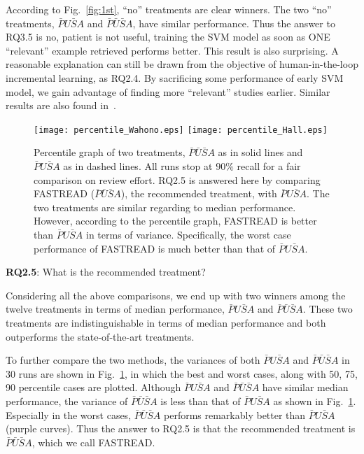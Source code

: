 \documentclass{svjour3}
\theoremstyle{break}
\begin{document}
According to Fig.~\ref{fig:1st}, ``no'' treatments are clear winners. The two ``no'' treatments, $\bar{P}U\bar{S}A$ and $\bar{P}\bar{U}\bar{S}A$, have similar performance. Thus the answer to RQ3.5 is no, patient is not useful, training the SVM model as soon as ONE ``relevant'' example retrieved performs better. This result is also surprising. A reasonable explanation can still be drawn from the objective of human-in-the-loop incremental learning, as RQ2.4. By sacrificing some performance of early SVM model, we gain advantage of finding more ``relevant'' studies earlier. Similar results are also found in~\cite{cormack2014evaluation}.



\begin{figure}[t]
    \centering
    \texttt{[image: percentile\_Wahono.eps]}
    \texttt{[image: percentile\_Hall.eps]}
    \caption{Percentile graph of two treatments, $\bar{P}\bar{U}\bar{S}A$ as in solid lines and $\bar{P}U\bar{S}A$ as in dashed lines. All runs stop at $90\%$ recall for a fair comparison on review effort. RQ2.5 is answered here by comparing FASTREAD ($\bar{P}\bar{U}\bar{S}A$), the recommended treatment, with $\bar{P}U\bar{S}A$. The two treatments are similar regarding to median performance. However, according to the percentile graph, FASTREAD is better than $\bar{P}U\bar{S}A$ in terms of variance. Specifically, the worst case performance of FASTREAD is much better than that of $\bar{P}U\bar{S}A$.}
    \label{fig:percentile}
\end{figure}

\textbf{RQ2.5}: What is the recommended treatment?

Considering all the above comparisons, we end up with two winners among the twelve treatments in terms of median performance, $\bar{P}U\bar{S}A$ and $\bar{P}\bar{U}\bar{S}A$. These two treatments are indistinguishable in terms of median performance and both outperforms the state-of-the-art treatments.

To further compare the two methods, the variances of both $\bar{P}U\bar{S}A$ and $\bar{P}\bar{U}\bar{S}A$ in $30$ runs are shown in Fig.~\ref{fig:percentile}, in which the best and worst cases, along with 50, 75, 90 percentile cases are plotted. Although $\bar{P}U\bar{S}A$ and $\bar{P}\bar{U}\bar{S}A$ have similar median performance, the variance of $\bar{P}\bar{U}\bar{S}A$ is less than that of $\bar{P}U\bar{S}A$ as shown in Fig.~\ref{fig:percentile}. Especially in the worst cases, $\bar{P}\bar{U}\bar{S}A$ performs remarkably better than $\bar{P}U\bar{S}A$ (purple curves). Thus the answer to RQ2.5 is that the recommended treatment is $\bar{P}\bar{U}\bar{S}A$, which we call FASTREAD.
\end{document}
